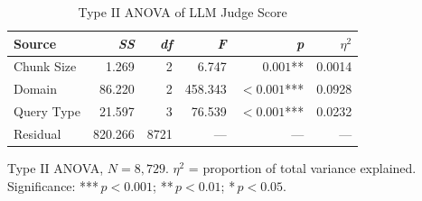 
\begin{table}[!t]
  \caption{Type II ANOVA of LLM Judge Score}
  \label{tab:anova_interactions}
  \centering
  \renewcommand{\arraystretch}{1.2}
  \begin{tabular}{lrrrrr}
    \hline
    \textbf{Source} & \textbf{\textit{SS}} & \textbf{\textit{df}} & \textbf{\textit{F}} & \textbf{\textit{p}} & \boldmath$\eta^2$ \\
    \hline
    Chunk Size  & 1.269 & 2 & 6.747 & $0.001$** & 0.0014 \\
    Domain      & 86.220 & 2 & 458.343 & $<0.001$*** & 0.0928 \\
    Query Type  & 21.597 & 3 & 76.539 & $<0.001$*** & 0.0232 \\
    \hline
    Residual    & 820.266 & 8721 & --- & --- & --- \\
    \hline
  \end{tabular}
  \begin{tablenotes}
    \small
    \item Type II ANOVA, $N = 8{,}729$. $\eta^2$ = proportion of total variance explained.
    Significance: ***\,$p < 0.001$; **\,$p < 0.01$; *\,$p < 0.05$.
  \end{tablenotes}
\end{table}
